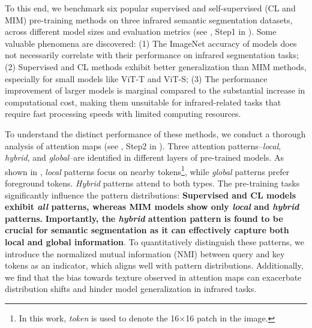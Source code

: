 To this end, we benchmark six popular supervised and self-supervised (CL and MIM) pre-training methods on three infrared semantic segmentation datasets, across different model sizes and evaluation metrics (see , Step1 in ). Some valuable phenomena are discovered: (1) The ImageNet accuracy of models does not necessarily correlate with their performance on infrared segmentation tasks; (2) Supervised and CL methods exhibit better generalization than MIM methods, especially for small models like ViT-T and ViT-S;  (3) The performance improvement of larger models is marginal compared to the substantial increase in computational cost, making them unsuitable for infrared-related tasks that require fast processing speeds with limited computing resources.

To understand the distinct performance of these methods, we conduct a thorough analysis of attention maps (see , Step2 in ). Three attention patterns--\textit{local}, \textit{hybrid}, and \textit{global}--are identified in different layers of pre-trained models. As shown in , \textit{local} patterns focus on nearby tokens\footnote{In this work, \textit{token} is used to denote the 16$\times$16 patch in the image.},  while \textit{global} patterns prefer foreground tokens. \textit{Hybrid} patterns attend to both types. The pre-training tasks significantly influence the pattern distributions: \textbf{Supervised and CL models exhibit \textit{all} patterns, whereas MIM models show only \textit{local} and \textit{hybrid} patterns.} \textbf{Importantly, the \textit{hybrid} attention pattern is found to be crucial for semantic segmentation as it can effectively capture both local and global information}. To quantitatively distinguish these patterns, we introduce the normalized mutual information (NMI) between query and key tokens as an indicator, which aligns well with pattern distributions. Additionally, we find that the bias towards texture observed in attention maps can exacerbate distribution shifts and hinder model generalization in infrared tasks.

